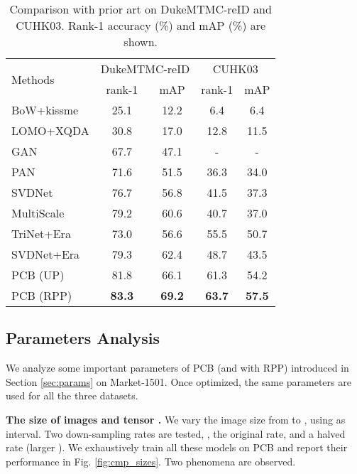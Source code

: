 \documentclass[10pt,twocolumn,letterpaper]{article}
\begin{document}
{{{\setlength{\tabcolsep}{4.6pt}
\begin{table}
\begin{center}
\begin{tabular}{l|cc|cc}
\hline
\multicolumn{1}{l|}{\multirow{2}{*}{Methods}}&\multicolumn{2}{c|}{DukeMTMC-reID}&\multicolumn{2}{c}{CUHK03}\\
\cline{2-5}
\multicolumn{1}{c|}{}&rank-1&mAP&rank-1&mAP\\
\hline
BoW+kissme \cite{DBLP:conf/iccv/ZhengSTWWT15} & 25.1 & 12.2 & 6.4 & 6.4\\
LOMO+XQDA \cite{DBLP:conf/cvpr/LiaoHZL15} & 30.8 & 17.0 & 12.8 & 11.5 \\
GAN \cite{zheng2017unlabeled} & {67.7}  & {47.1} & - & - \\
PAN \cite{Zheng2017PAN} & 71.6& 51.5 & 36.3 &34.0\\
SVDNet \cite{Sun2017SVDNet} &76.7&56.8&41.5&37.3\\
MultiScale \cite{ChenPerson_multiscale}   &79.2&60.6&40.7&37.0\\
TriNet+Era \cite{Zhong2017Random} &73.0&56.6&55.5&50.7\\
SVDNet+Era \cite{Zhong2017Random} &79.3&62.4&48.7&43.5\\
\hline
PCB (UP) &81.8&66.1 &61.3 & 54.2 \\
PCB (RPP)&\textbf{83.3}& \textbf{69.2} & \textbf{63.7} & \textbf{57.5} \\


\hline
\end{tabular}
\end{center}
\setlength{\abovecaptionskip}{0cm} 
\setlength{\belowcaptionskip}{0pt} 
\caption{Comparison with prior art on DukeMTMC-reID and CUHK03. Rank-1 accuracy (\%) and mAP (\%) are shown. }
\label{table:duke}
\end{table}





\subsection{Parameters Analysis}\label{sec:cmp_params}
We analyze some important parameters of PCB (and with RPP) introduced in Section \ref{sec:params} on Market-1501. Once optimized, the same parameters are used for all the three datasets. 

\textbf{The size of images and tensor \bm{}.} We vary the image size from  to , using  as interval. Two down-sampling rates are tested, \ie, the original rate, and a halved rate (larger \bm{}).   
We exhaustively train all these models on PCB and report their performance in Fig. \ref{fig:cmp_sizes}. Two phenomena are observed.

}}}
\end{document}
